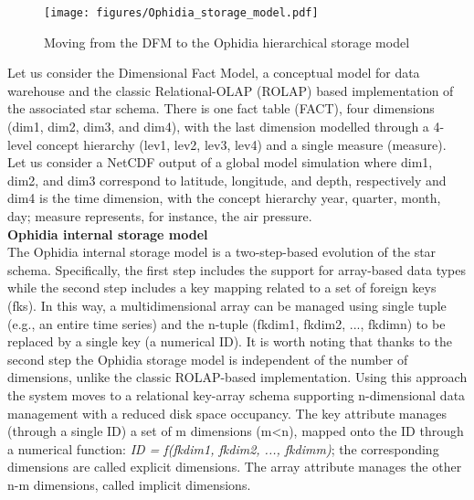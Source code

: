 \begin{figure}
	\centering
	\texttt{[image: figures/Ophidia\_storage\_model.pdf]}
	\caption{Moving from the DFM to the Ophidia hierarchical storage model}
	\label{fig: The Ophidia Storage Model}
\end{figure}

Let us consider the Dimensional Fact Model, a conceptual model for data warehouse and the classic Relational-OLAP (ROLAP) based implementation of the associated star schema. There is one fact table (FACT), four dimensions (dim1, dim2, dim3, and dim4), with the last dimension modelled through a 4-level concept hierarchy (lev1, lev2, lev3, lev4) and a single measure (measure). Let us consider a NetCDF output of a global model simulation where dim1, dim2, and dim3 correspond to latitude, longitude, and depth, respectively and dim4 is the time dimension, with the concept hierarchy year, quarter, month, day; measure represents, for instance, the air pressure.\\

\textbf{Ophidia internal storage model}\\

The Ophidia internal storage model is a two-step-based evolution of the star schema. Specifically, the first step includes the support for array-based data types while the second step includes a key mapping related to a set of foreign keys (fks). In this way, a multidimensional array can be managed using single tuple (e.g., an entire time series) and the n-tuple (fk\textunderscore dim1, fk\textunderscore dim2, ..., fk\textunderscore dimn) to be replaced by a single key (a numerical ID). It is worth noting that thanks to the second step the Ophidia storage model is independent of the number of dimensions, unlike the classic ROLAP-based implementation. Using this approach the system moves to a relational key-array schema supporting n-dimensional data management with a reduced disk space occupancy. The key attribute manages (through a single ID) a set of m dimensions (m<n), mapped onto the ID through a numerical function: \textit{ID = f(fk\textunderscore dim1, fk\textunderscore dim2, ..., fk\textunderscore dimm)}; the corresponding dimensions are called explicit dimensions. The array attribute manages the other n-m dimensions, called implicit dimensions.

